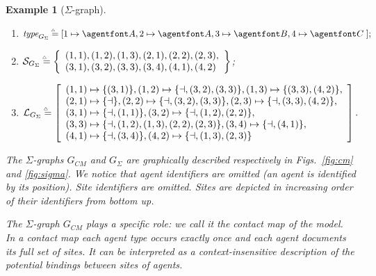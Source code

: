 \documentclass{entcs}
\newcommand{\map}[2]{#2}
\newcommand{\freesymbol}{\dashv}
\newcommand{\graphsymb}{G}
\newcommand{\bydef}{\stackrel{\scalebox{0.8}{\!\!$\scriptscriptstyle{\triangle}$}}{=}}
\newcommand{\type}[1][\graphsymb]{\textit{type}_{#1}}
\newcommand{\sites}[1][\graphsymb]{\mathcal{S}_{#1}}
\newcommand{\links}[1][\graphsymb]{\mathcal{L}_{#1}}
\newtheorem{myexample}[thm]{Example}
\begin{document}
\begin{myexample}[$\Sigma$-graph]
\begin{enumerate}
  \item $\type[\graphsymb_{\Sigma}]\bydef \map{\begin{cases}\begin{array}{ccc}%
  1 &\mapsto&\agent{A}{}\cr%
  2 &\mapsto&\agent{A}{}\cr%
  3 &\mapsto&\agent{B}{}\cr%
  4 &\mapsto&\agent{C}{}\cr%
\end{array}\end{cases}}{[1 \mapsto \agent{A}{}, 2 \mapsto \agent{A}{}, 3 \mapsto \agent{B}{}, 4 \mapsto \agent{C}{}\;];}$
  \item $\sites[\graphsymb_{\Sigma}]\bydef\left\{\begin{array}{l}(1,1),(1,2),(1,3),(2,1),(2,2),(2,3),\cr(3,1),(3,2),(3,3),(3,4),(4,1),(4,2)\end{array}\right\}$;
  \item $\links[\graphsymb_{\Sigma}]\bydef\map{}{\left[%
  \begin{array}{l}
    (1,1)\mapsto\{%
    (3,1)\},
    (1,2)\mapsto\{\freesymbol,(3,2),(3,3)\},
    (1,3)\mapsto\{%
    (3,3),(4,2)\},\cr%
    (2,1)\mapsto\{\freesymbol\},
    (2,2)\mapsto\{\freesymbol,(3,2),(3,3)\},
    (2,3)\mapsto\{\freesymbol,(3,3),(4,2)\},\cr%
    (3,1)\mapsto\{\freesymbol,(1,1)\},
    (3,2)\mapsto\{\freesymbol,(1,2),(2,2)\},\cr (3,3)\mapsto\{\freesymbol,(1,2),(1,3),(2,2),(2,3)\},
    (3,4)\mapsto\{\freesymbol,(4,1)\},\cr%
    (4,1)\mapsto\{\freesymbol,(3,4)\},
    (4,2)\mapsto\{\freesymbol,(1,3),(2,3)\}
  \end{array}\right]}.$
\end{enumerate}
The $\Sigma$-graphs $\graphsymb_{\textit{CM}}$ and $\graphsymb_{\Sigma}$
are graphically described respectively in Figs.~\ref{fig:cm} and \ref{fig:sigma}. We notice that agent identifiers are omitted (an agent is identified by its position). Site identifiers are omitted. Sites are depicted in increasing order of their identifiers from bottom up.

The $\Sigma$-graph $\graphsymb_{\textit{CM}}$ plays a specific role: we call it the contact map of the model. In a contact map each agent type occurs exactly once and each agent documents its full set of sites. It can be
interpreted as a context-insensitive description of the potential bindings
between sites of agents.
\end{myexample}
\end{document}
